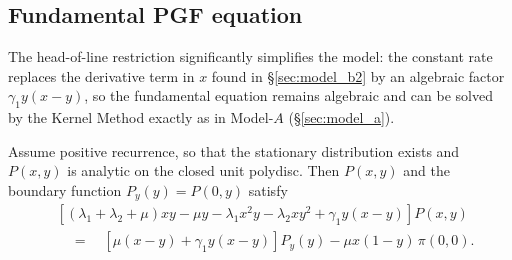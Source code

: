 \subsection{Fundamental PGF equation}

The head-of-line restriction significantly simplifies the model: the constant rate replaces the derivative term in $x$ found in \S\ref{sec:model_b2} by an algebraic factor $\gamma_1 y(x-y)$, so the fundamental equation remains algebraic and can be solved by the Kernel Method exactly as in Model-$A$ (\S\ref{sec:model_a}).

\begin{lemma}\label{lem:B21:fundamental}
Assume positive recurrence, so that the stationary distribution exists and
$P(x,y)$ is analytic on the closed unit
polydisc. Then $P(x,y)$ and the boundary function $P_y(y)=P(0,y)$ satisfy
\begin{equation}
    \begin{split}
        &\left[(\lambda_1+\lambda_2+\mu)xy - \mu y - \lambda_1 x^2y - \lambda_2 xy^2
               + \gamma_1 y(x-y)\right]P(x,y) \\
        &\quad=\quad \left[\mu(x-y) + \gamma_1 y(x-y)\right]P_y(y)
               - \mu x(1-y)\,\pi(0,0).
    \end{split}
    \label{eq:B21:fundamental}
\end{equation}
\end{lemma}

